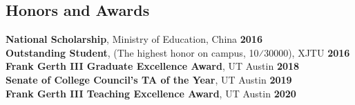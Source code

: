 \documentclass[margin,line]{res}
\newenvironment{list1}{
  \begin{list}{\ding{113}}{%
      \setlength{\itemsep}{0in}
      \setlength{\parsep}{0in} \setlength{\parskip}{0in}
      \setlength{\topsep}{0in} \setlength{\partopsep}{0in} 
      \setlength{\leftmargin}{0.17in}}}{\end{list}}
\begin{document}
\begin{resume}




\section{\sc Honors and Awards} 
{\bf National Scholarship}, 
Ministry of Education, China \hfill {\bf 2016}\\
{\bf Outstanding Student}, (The highest honor on campus, 10⁄30000),
XJTU \hfill {\bf 2016}\\
{\bf Frank Gerth III Graduate Excellence Award}, UT Austin \hfill {\bf 2018}\\
{\bf Senate of College Council's TA of the Year}, UT Austin \hfill {\bf 2019}\\
{\bf Frank Gerth III Teaching Excellence Award}, UT Austin \hfill {\bf 2020}


\end{resume}
\end{document}
